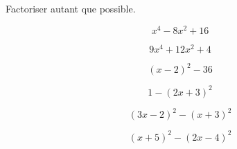 \consigne{}{} Factoriser autant que possible.

\begin{multicols}{3}
     $$x^4-8x^2+16$$

     $$9x^4+12x^2+4$$

     $$(x-2)^2-36$$

     $$1-(2x+3)^2$$

     $$(3x-2)^2-(x+3)^2$$

     $$(x+5)^2-(2x-4)^2$$
\end{multicols}





